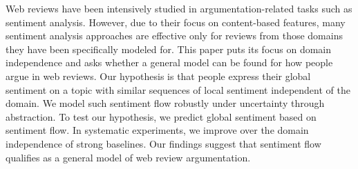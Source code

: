 Web reviews have been intensively studied in argumentation-related tasks such as sentiment analysis. However, due to their focus on content-based features, many sentiment analysis approaches are effective only for reviews from those domains they have been specifically modeled for. This paper puts its focus on domain independence and asks whether a general model can be found for how people argue in web reviews. Our hypothesis is that people express their global sentiment on a topic with similar sequences of local sentiment independent of the domain. We model such sentiment flow robustly under uncertainty through abstraction. To test our hypothesis, we predict global sentiment based on sentiment flow. In systematic experiments, we improve over the domain independence of strong baselines. Our findings suggest that sentiment flow qualifies as a general model of web review argumentation.
